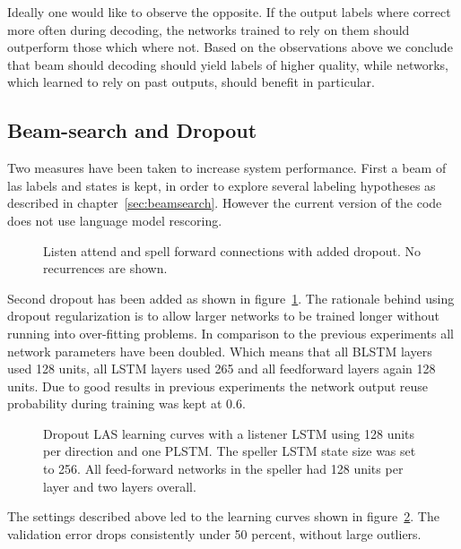 Ideally one would like to observe the opposite. If the output labels where correct more often during decoding, the networks trained to rely on them should outperform those which where not. Based on the observations above we conclude that beam should decoding should yield labels of higher quality, while networks, which learned to rely on past outputs, should benefit in particular.

\subsection{Beam-search and Dropout}
Two measures have been taken to increase system performance. First a beam of las labels and states is kept, in order to explore several labeling hypotheses as described in chapter~\ref{sec:beamsearch}. However the current version of the code does not use language model rescoring.

\begin{figure}
\centering

\caption{Listen attend and spell forward connections with added dropout. No recurrences are shown.}
\label{fig:dropout}
\end{figure}
Second dropout has been added as shown in figure~\ref{fig:dropout}. The rationale behind using dropout regularization is to allow larger networks to be trained longer without running into over-fitting problems. In comparison to the previous experiments all network parameters have been doubled. Which means that all BLSTM layers used 128 units, all LSTM layers used 265 and all feedforward layers again 128 units. Due to good results in previous experiments the network output reuse probability during training was kept at 0.6. 
\begin{figure}


\caption{Dropout LAS learning curves with a listener LSTM using 128 units per direction and one PLSTM. The speller LSTM state size was set to 256. All feed-forward networks in the speller had 128 units per layer and two layers overall.}
\label{fig:dropBeamRes}
\end{figure}
The settings described above led to the learning curves shown in figure~\ref{fig:dropBeamRes}. The validation error drops consistently under 50 percent, without large outliers. 

